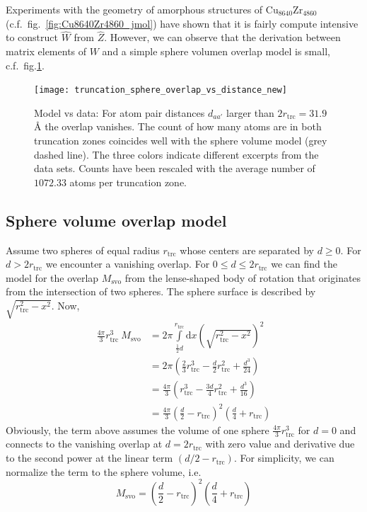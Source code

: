 \documentclass[a4paper]{article}
\newcommand{\um}[1]{_{\mathrm{#1}}}
\begin{document}
Experiments with the geometry of amorphous structures of 
$\mathrm{Cu}_{8640}\mathrm{Zr}_{4860}$ (c.f.~fig.~\ref{fig:Cu8640Zr4860_jmol})
have shown that it is fairly compute intensive to construct $\hat W$ from $\hat Z$.
However, we can observe that the derivation between matrix elements of $W$ and a simple
sphere volumen overlap model is small, c.f.~fig.\ref{fig:truncation_sphere_overlap_vs_distance}.

\begin{figure}[h!]
\begin{center}
  \texttt{[image: truncation\_sphere\_overlap\_vs\_distance\_new]}
  \caption{Model vs data:
  For atom pair distances $d_{aa'}$ larger than $2r\um{trc} = 31.9\,$\AA{} the overlap vanishes.
  The count of how many atoms are in both truncation zones coincides well with the sphere volume model (grey dashed line).
  The three colors indicate different excerpts from the data sets.
  Counts have been rescaled with the average number of $1072.33$ atoms per truncation zone.
  }
\end{center}
\label{fig:truncation_sphere_overlap_vs_distance}
\end{figure}

\subsection{Sphere volume overlap model} \label{sec:sphere_volume_overlap_model}

Assume two spheres of equal radius $r\um{trc}$ whose centers are separated by $d \geq 0$.
For $d > 2 r\um{trc}$ we encounter a vanishing overlap.
For $0 \leq d \leq 2 r\um{trc}$ we can find the model for the overlap $M\um{svo}$ from the lense-shaped body of rotation that
originates from the intersection of two spheres.
The sphere surface is described by $\sqrt{r\um{trc}^2 - x^2}$.
Now,
\begin{align*}
 \frac{4\pi}{3} r\um{trc}^3 \  M\um{svo}	&= 2 \pi \int\limits_{\frac 12 d}^{r\um{trc}} \mathrm d x \left( \sqrt{ r\um{trc}^2 - x^2 } \right)^2 \\
			&= 2 \pi \left( \frac 23 r\um{trc}^3 - \frac d2 r\um{trc}^2 + \frac{d^3}{24} \right) \\
			&= \frac{4\pi}{3} \left( r\um{trc}^3 - \frac{3d}{4} r\um{trc}^2 + \frac{d^3}{16} \right)  \\
			&= \frac{4\pi}{3} \left( \frac d2 - r\um{trc} \right)^2 \left(\frac d4 + r\um{trc} \right) %
\end{align*}
Obviously, the term above assumes the volume of one sphere $\frac{4\pi}{3} r\um{trc}^3$ for $d=0$
and connects to the vanishing overlap at $d=2r\um{trc}$ with zero value and derivative 
due to the second power at the linear term $(d/2 - r\um{trc})$.
For simplicity, we can normalize the term to the sphere volume, i.e.~
\begin{equation}
 M\um{svo} = \left( \frac d2 - r\um{trc} \right)^2 \left(\frac d4 + r\um{trc} \right) \label{eqn:sphere_volume_overlap_model}
\end{equation}
\end{document}
